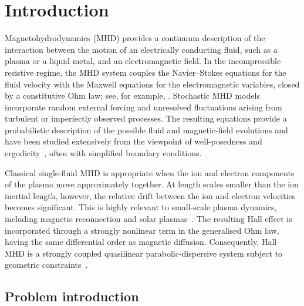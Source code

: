 \documentclass[11pt, reqno]{amsart}
\theoremstyle{definition}
\numberwithin{equation}{section}
\begin{document}


\section{Introduction}
Magnetohydrodynamics (MHD) provides a continuum description of the interaction between the motion of an electrically conducting fluid, such as a plasma or a liquid metal, and an electromagnetic field. In the incompressible resistive regime, the MHD system couples the Navier--Stokes equations for the fluid velocity with the Maxwell equations for the electromagnetic variables, closed by a constitutive Ohm law; see, for example, \cite{Dav17, SerTem83}.
Stochastic MHD models incorporate random external forcing and unresolved fluctuations arising from turbulent or imperfectly observed processes. The resulting equations provide a probabilistic description of the possible fluid and magnetic-field evolutions and have been studied extensively from the viewpoint of well-posedness and ergodicity~\cite{BarPra07, Mot22, SriSun99,  Yam19}, often with simplified boundary conditions.

Classical single-fluid MHD is appropriate when the ion and electron components of the plasma move approximately together. At length scales smaller than the ion inertial length, however, the relative drift between the ion and electron velocities becomes significant. This is highly relevant to small-scale plasma dynamics, including magnetic reconnection and solar plasmas~\cite{SimCha08}. The resulting Hall effect is incorporated through a strongly nonlinear term in the generalised Ohm law, having the same differential order as magnetic diffusion. Consequently, Hall--MHD is a strongly coupled quasilinear parabolic-dispersive system subject to geometric constraints~\cite{AchDegFroLiu11, ChaDegLiu14, Dai21}.


\subsection{Problem introduction}
\end{document}
